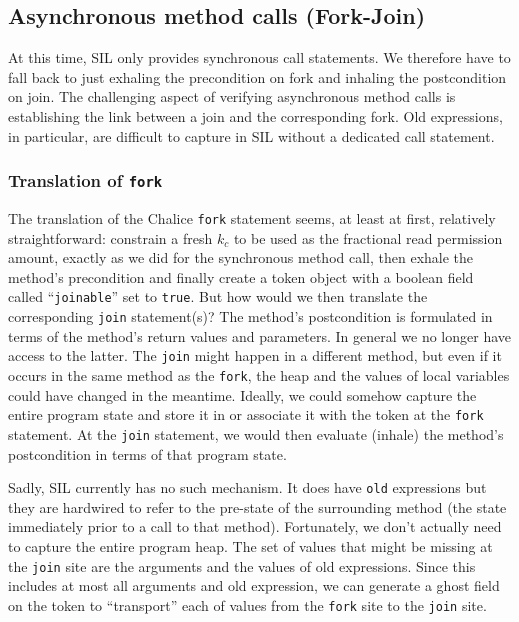 \subsection{Asynchronous method calls (Fork-Join)}\label{sct:fj}
At this time, SIL only provides synchronous call statements. 
We therefore have to fall back to just exhaling the precondition on fork and inhaling the postcondition on join. 
The challenging aspect of verifying asynchronous method calls is establishing the link between a join and the corresponding fork.
Old expressions, in particular, are difficult to capture in SIL without a dedicated call statement.

\subsubsection{Translation of \lstinline!fork!}\label{sct:fjfork}

The translation of the Chalice \lstinline!fork! statement seems, at least at first, relatively straightforward: constrain a fresh $k_c$ to be used as the fractional read permission amount, exactly as we did for the synchronous method call, then exhale the method's precondition and finally create a token object with a boolean field called ``\lstinline!joinable!'' set to \lstinline!true!.
But how would we then translate the corresponding \lstinline!join! statement(s)? The method's postcondition is formulated in terms of the method's return values and parameters.
In general we no longer have access to the latter.
The \lstinline!join! might happen in a different method, but even if it occurs in the same method as the \lstinline!fork!, the heap and the values of local variables could have changed in the meantime.
Ideally, we could somehow capture the entire program state and store it in or associate it with the token at the \lstinline!fork! statement.
At the \lstinline!join! statement, we would then evaluate (inhale) the method's postcondition in terms of that program state.

Sadly, SIL currently has no such mechanism. 
It does have \lstinline[language=SIL]!old! expressions but they are hardwired to refer to the pre-state of the surrounding method (the state immediately prior to a call to that method).
Fortunately, we don't actually need to capture the entire program heap. 
The set of values that might be missing at the \lstinline!join! site are the arguments and the values of old expressions. 
Since this includes at most all arguments and old expression, we can generate a ghost field on the token to ``transport'' each of values from the \lstinline!fork! site to the \lstinline!join! site.

